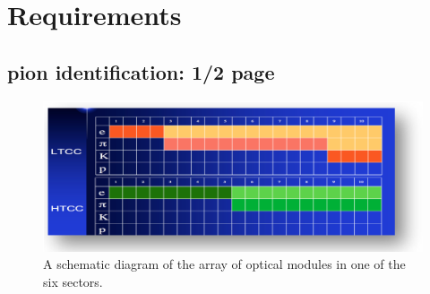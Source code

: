 \section{Requirements}

\subsection{pion identification: 1/2 page}

\begin{figure}[hbt]
	\centering
	\includegraphics[width=1.0\columnwidth,keepaspectratio]{img/newScope.png}
	\caption{A schematic diagram of the array of optical modules in one of the six sectors.}
	\label{fig:newScope}
\end{figure}

